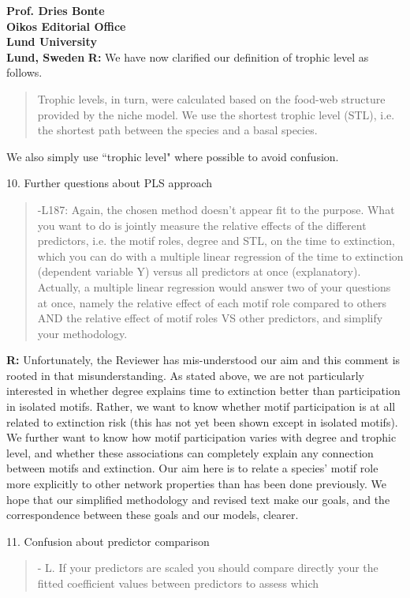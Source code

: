 \documentclass[12pt]{letter}
\begin{document}
\begin{letter}{\bf Prof. Dries Bonte\\
Oikos Editorial Office \\
Lund University \\
Lund, Sweden}
      \textbf{R:}
      We have now clarified our definition of trophic level as follows.
      
      \begin{quotation}
        Trophic levels, in turn, were calculated based on the food-web structure provided by the niche model. We use the shortest trophic level (STL), i.e. the shortest path between the species and a basal species.
      \end{quotation}
      
      We also simply use ``trophic level" where possible to avoid confusion.

    10. Further questions about PLS approach 

        \begin{quotation}
        -L187: Again, the chosen method doesn't appear fit to the purpose. What you want to do is jointly measure the relative effects of the different predictors, i.e. the motif roles, degree and STL, on the time to extinction, which you can do with a multiple linear regression of the time to extinction (dependent variable Y) versus all predictors at once (explanatory). Actually, a multiple linear regression would answer two of your questions at once, namely the relative effect of each motif role compared to others AND the relative effect of motif roles VS other predictors, and simplify your methodology.
        \end{quotation}
        
        \textbf{R:} Unfortunately, the Reviewer has mis-understood our aim and this comment is rooted in that misunderstanding.
        As stated above, we are not particularly interested in whether degree explains time to extinction better than participation in isolated motifs.
        Rather, we want to know whether motif participation is at all related to extinction risk (this has not yet been shown except in isolated motifs).
        We further want to know how motif participation varies with degree and trophic level, and whether these associations can completely explain any connection between motifs and extinction. 
        Our aim here is to relate a species' motif role more explicitly to other network properties than has been done previously.
        We hope that our simplified methodology and revised text make our goals, and the correspondence between these goals and our models, clearer.


    11. Confusion about predictor comparison
        
        \begin{quotation}
        - L. If your predictors are scaled you should compare directly your the fitted coefficient values between predictors to assess which
        \end{quotation}
        

\end{letter}
\end{document}
